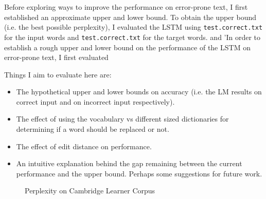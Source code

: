\documentclass[a4paper, 12pt]{report}
\newcommand{\ttt}[1]{\texttt{#1}}
\begin{document}
Before exploring ways to improve the performance on error-prone text, I first established an approximate upper and lower bound. To obtain the upper bound (i.e. the best possible perplexity), I evaluated the LSTM using \ttt{test.correct.txt} for the input words and \ttt{test.correct.txt} for the target words. and 'In order to establish a rough upper and lower bound on the performance of the LSTM on error-prone text, I first evaluated 

Things I aim to evaluate here are: \\

\begin{itemize}
\item
	The hypothetical upper and lower bounds on accuracy (i.e. the LM results on correct input and on incorrect input respectively).
\item
	The effect of using the vocabulary vs different sized dictionaries for determining if a word should be replaced or not.
\item
	The effect of edit distance on performance.
\item
	An intuitive explanation behind the gap remaining between the current performance and the upper bound. Perhaps some suggestions for future work.
\end{itemize}

\begin{figure}[h]
\begin{center}
\caption{Perplexity on Cambridge Learner Corpus}
\end{center}
\end{figure}
\end{document}
